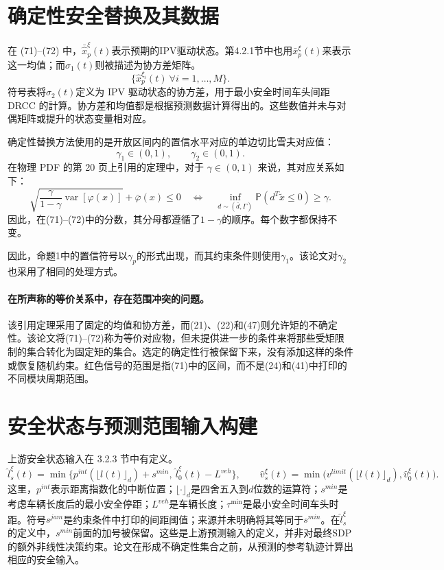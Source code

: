 \documentclass[10pt]{article}
\begin{document}
\section*{确定性安全替换及其数据}
在 (71)–(72) 中，\(\bar{\hat{x}}_p^\xi(t)\)表示预期的IPV驱动状态。第4.2.1节中也用\(\bar x_p^\xi(t)\)来表示这一均值；而\(\hat\sigma_1(t)\)则被描述为协方差矩阵。
\[
\{\hat x_p^{\xi_i}(t)\ \forall i=1,\ldots,M\}.
\]
符号表将\(\hat\sigma_2(t)\)定义为 IPV 驱动状态的协方差，用于最小安全时间车头间距 DRCC 的計算。协方差和均值都是根据预测数据计算得出的。这些数值并未与对偶矩阵或提升的状态变量相对应。

确定性替换方法使用的是开放区间内的置信水平对应的单边切比雪夫对应值：
\[
\gamma_1\in(0,1),\qquad\gamma_2\in(0,1).
\]
在物理 PDF 的第 20 页上引用的定理中，对于 \(\gamma\in(0,1)\) 来说，其对应关系如下：
\[
\sqrt{\frac{\gamma}{1-\gamma}\operatorname{var}[\varphi(x)]}
+\bar\varphi(x)\leq0
\quad\Longleftrightarrow\quad
\inf_{d\sim(\bar d,\Gamma)}\mathbb P(d^T\tilde x\leq0)\geq\gamma.
\]
因此，在(71)–(72)中的分数，其分母都遵循了\(1-\gamma\)的顺序。每个数字都保持不变。

因此，命题1中的置信符号以\(\gamma_p\)的形式出现，而其约束条件则使用\(\gamma_1\)。该论文对\(\gamma_2\)也采用了相同的处理方式。

\paragraph{在所声称的等价关系中，存在范围冲突的问题。}
该引用定理采用了固定的均值和协方差，而(21)、(22)和(47)则允许矩的不确定性。该论文将(71)--(72)称为等价对应物，但未提供进一步的条件来将那些受矩限制的集合转化为固定矩的集合。选定的确定性行被保留下来，没有添加这样的条件或恢复随机约束。红色信号的范围是指(71)中的区间，而不是(24)和(41)中打印的不同模块周期范围。

\section*{安全状态与预测范围输入构建}
上游安全状态输入在 3.2.3 节中有定义。
\[
\hat l_s^\xi(t)=\min\{p^{int}(\lfloor l(t)\rfloor_d)+s^{min},\ \hat l_0^\xi(t)-L^{veh}\},
\qquad
\hat v_s^\xi(t)=\min\big(v^{limit}(\lfloor l(t)\rfloor_d),\hat v_0^\xi(t)\big).
\]
这里，\(p^{int}\)表示距离指数化的中断位置；\(\lfloor\cdot\rfloor_d\)是四舍五入到\(d\)位数的运算符；\(s^{min}\)是考虑车辆长度后的最小安全停距；\(L^{veh}\)是车辆长度；\(\tau^{\min}\)是最小安全时间车头时距。符号\(s^{jam}\)是约束条件中打印的间距阈值；来源并未明确将其等同于\(s^{min}\)。在\(\hat l_s^\xi\)的定义中，\(s^{min}\)前面的加号被保留。这些是上游预测输入的定义，并非对最终SDP的额外非线性决策约束。论文在形成不确定性集合之前，从预测的参考轨迹计算出相应的安全输入。
\end{document}
